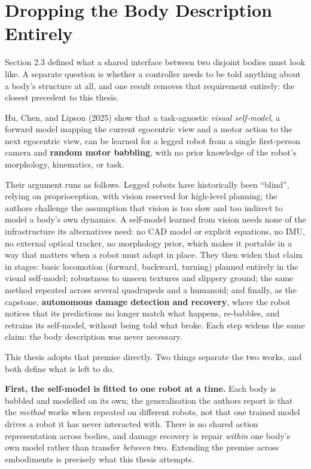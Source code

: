 \documentclass[12pt,a4paper,oneside]{report}
\begin{document}
\section{Dropping the Body Description Entirely}
Section 2.3 defined what a shared interface between two disjoint bodies must look like. A separate
question is whether a controller needs to be told anything about a body's structure at all, and one
result removes that requirement entirely: the closest precedent to this thesis.

Hu, Chen, and Lipson (2025) show that a task-agnostic \emph{visual self-model}, a forward model
mapping the current egocentric view and a motor action to the next egocentric view, can be learned
for a legged robot from a single first-person camera and \textbf{random motor babbling}, with no prior
knowledge of the robot's morphology, kinematics, or task.

Their argument runs as follows. Legged robots have historically been ``blind'', relying on
proprioception, with vision reserved for high-level planning; the authors challenge the assumption
that vision is too slow and too indirect to model a body's own dynamics. A self-model learned from
vision needs none of the infrastructure its alternatives need: no CAD model or explicit equations,
no IMU, no external optical tracker, no morphology prior, which makes it portable in a way that
matters when a robot must adapt in place. They then widen that claim in stages: basic locomotion
(forward, backward, turning) planned entirely in the visual self-model; robustness to unseen textures
and slippery ground; the same method repeated across several quadrupeds and a humanoid; and finally,
as the capstone, \textbf{autonomous damage detection and recovery}, where the robot notices that its
predictions no longer match what happens, re-babbles, and retrains its self-model, without being told
what broke. Each step widens the same claim: the body description was never necessary.

This thesis adopts that premise directly. Two things separate the two works, and both define what is
left to do.

\textbf{First, the self-model is fitted to one robot at a time.} Each body is babbled and modelled on
its own; the generalisation the authors report is that the \emph{method} works when repeated on
different robots, not that one trained model drives a robot it has never interacted with. There is no
shared action representation across bodies, and damage recovery is repair \emph{within} one body's own
model rather than transfer \emph{between} two. Extending the premise across embodiments is precisely
what this thesis attempts.
\end{document}
